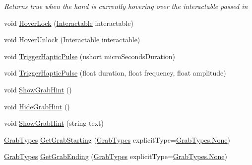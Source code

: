 \begin{DoxyCompactItemize}
\begin{DoxyCompactList}\small\item\em Returns true when the hand is currently hovering over the interactable passed in \end{DoxyCompactList}\item 
void \mbox{\hyperlink{class_valve_1_1_v_r_1_1_interaction_system_1_1_hand_a07600fb46d1bdbf3a02e70197d471134}{Hover\+Lock}} (\mbox{\hyperlink{class_valve_1_1_v_r_1_1_interaction_system_1_1_interactable}{Interactable}} interactable)
\item 
void \mbox{\hyperlink{class_valve_1_1_v_r_1_1_interaction_system_1_1_hand_aebd333682282351892fcc4b9df395e30}{Hover\+Unlock}} (\mbox{\hyperlink{class_valve_1_1_v_r_1_1_interaction_system_1_1_interactable}{Interactable}} interactable)
\item 
void \mbox{\hyperlink{class_valve_1_1_v_r_1_1_interaction_system_1_1_hand_ab9e8c722bbad5cb37f0268f4c1745118}{Trigger\+Haptic\+Pulse}} (ushort micro\+Seconds\+Duration)
\item 
void \mbox{\hyperlink{class_valve_1_1_v_r_1_1_interaction_system_1_1_hand_a84aea2a4f260ef66494bd28ab0d8a590}{Trigger\+Haptic\+Pulse}} (float duration, float frequency, float amplitude)
\item 
void \mbox{\hyperlink{class_valve_1_1_v_r_1_1_interaction_system_1_1_hand_a261392cdd2f2a398b16738ea522fb099}{Show\+Grab\+Hint}} ()
\item 
void \mbox{\hyperlink{class_valve_1_1_v_r_1_1_interaction_system_1_1_hand_a186d8af3a990ec94164f6aa62ac1d2c4}{Hide\+Grab\+Hint}} ()
\item 
void \mbox{\hyperlink{class_valve_1_1_v_r_1_1_interaction_system_1_1_hand_afbcf3d7dcdde4b461f890516debfba02}{Show\+Grab\+Hint}} (string text)
\item 
\mbox{\hyperlink{namespace_valve_1_1_v_r_1_1_interaction_system_ae03ab84d315f5997fd000817bfb96a0f}{Grab\+Types}} \mbox{\hyperlink{class_valve_1_1_v_r_1_1_interaction_system_1_1_hand_a3708622be32d8aaca12d368c0fed2047}{Get\+Grab\+Starting}} (\mbox{\hyperlink{namespace_valve_1_1_v_r_1_1_interaction_system_ae03ab84d315f5997fd000817bfb96a0f}{Grab\+Types}} explicit\+Type=\mbox{\hyperlink{namespace_valve_1_1_v_r_1_1_interaction_system_ae03ab84d315f5997fd000817bfb96a0fa6adf97f83acf6453d4a6a4b1070f3754}{Grab\+Types.\+None}})
\item 
\mbox{\hyperlink{namespace_valve_1_1_v_r_1_1_interaction_system_ae03ab84d315f5997fd000817bfb96a0f}{Grab\+Types}} \mbox{\hyperlink{class_valve_1_1_v_r_1_1_interaction_system_1_1_hand_a100e68b26d6ab2e0eeba965e1ef99989}{Get\+Grab\+Ending}} (\mbox{\hyperlink{namespace_valve_1_1_v_r_1_1_interaction_system_ae03ab84d315f5997fd000817bfb96a0f}{Grab\+Types}} explicit\+Type=\mbox{\hyperlink{namespace_valve_1_1_v_r_1_1_interaction_system_ae03ab84d315f5997fd000817bfb96a0fa6adf97f83acf6453d4a6a4b1070f3754}{Grab\+Types.\+None}})

\end{DoxyCompactItemize}

